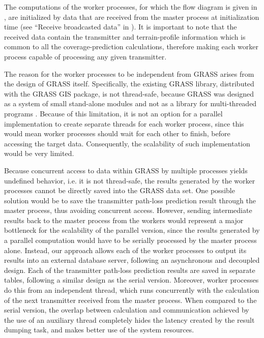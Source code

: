 The computations of the worker processes, for which the flow diagram
is given in , are initialized
by data that are received from the master process at initialization
time (see ``Receive broadcasted data'' in ).
It is important to note that the received data contain the transmitter
and terrain-profile information which is common to all the coverage-prediction
calculations, therefore making each worker process capable of processing
any given transmitter.

The reason for the worker processes to be independent from GRASS arises
from the design of GRASS itself. Specifically, the existing GRASS
library, distributed with the GRASS GIS package, is not thread-safe,
because GRASS was designed as a system of small stand-alone modules
and not as a library for multi-threaded programs \cite{Blazek_GRASS_server:2004}.
Because of this limitation, it is not an option for a parallel implementation
to create separate threads for each worker process, since this would
mean worker processes should wait for each other to finish, before
accessing the target data. Consequently, the scalability of such implementation
would be very limited.

Because concurrent access to data within GRASS by multiple processes
yields undefined behavior, i.e. it is not thread-safe, the results
generated by the worker processes cannot be directly saved into the
GRASS data set. One possible solution would be to save the transmitter
path-loss prediction result through the master process, thus avoiding
concurrent access. However, sending intermediate results back to the
master process from the workers would represent a major bottleneck
for the scalability of the parallel version, since the results generated
by a parallel computation would have to be serially processed by the
master process alone. Instead, our approach allows each of the worker
processes to output its results into an external database server,
following an asynchronous and decoupled design. Each of the transmitter
path-loss prediction results are saved in separate tables, following
a similar design as the serial version. Moreover, worker processes
do this from an independent thread, which runs concurrently with the
calculation of the next transmitter received from the master process.
When compared to the serial version, the overlap between calculation
and communication achieved by the use of an auxiliary thread completely
hides the latency created by the result dumping task, and makes better
use of the system resources.

